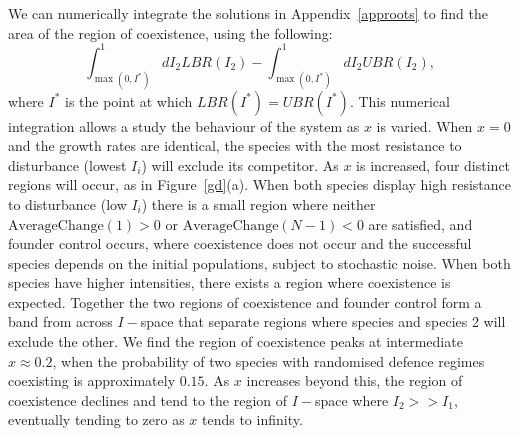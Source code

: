 \documentclass[preprint,10pt,reqno]{amsart}
\begin{document}
We can numerically integrate the solutions in Appendix~\ref{approots} to find the area of the region of coexistence, using the following:
\begin{equation}
\int_{\max(0,I^*)}^1 dI_2 LBR(I_2) - \int_{\max(0,I^*)}^1 dI_2 UBR(I_2),
\end{equation}
where $I^*$ is the point at which $LBR(I^*)=UBR(I^*)$. This numerical integration allows a study the behaviour of the system as $x$ is varied. When $x=0$ and the growth rates are identical, the species with the most resistance to disturbance (lowest $I_i$) will exclude its competitor.  As $x$ is increased, four distinct regions will occur, as in Figure~\ref{gd}(a). When both species display high resistance to disturbance (low $I_i$) there is a small region where neither $\text{AverageChange}(1)>0$ or $\text{AverageChange}(N-1)<0$ are satisfied, and founder control occurs, where coexistence does not occur and the successful species depends on the initial populations, subject to stochastic noise. When both species have higher intensities, there exists a region where coexistence is expected. Together the two regions of coexistence and founder control form a band from across $I-$space that separate regions where species and species 2 will exclude the other. We find the region of coexistence peaks at intermediate $x \approx 0.2$, when the probability of two species with randomised defence regimes coexisting is approximately $0.15$. As $x$ increases beyond this, the region of coexistence declines and tend to the region of $I-$space where $I_2>>I_1$, eventually tending to zero as $x$ tends to infinity.
\end{document}
